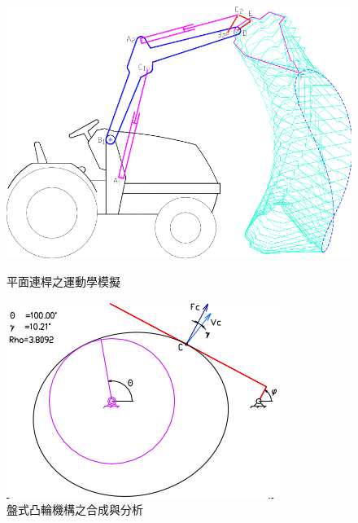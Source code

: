 \documentclass[14pt,a4paper]{report}  %
\begin{document}
       	\begin{figure}[H]
		\centering
		\includegraphics[scale=0.4]{平面連桿之運動學模擬.png} 
		\caption{平面連桿之運動學模擬} 
		\label{fig_平面連桿之運動學模擬:scale}
		
		\includegraphics[scale=0.8]{盤式凸輪機構之合成與分析.png} 
		\caption{盤式凸輪機構之合成與分析} 
		\label{fig_盤式凸輪機構之合成與分析:scale}   
    	\end{figure}
		\hspace*{\fill} \\
\newpage
\end{document}
